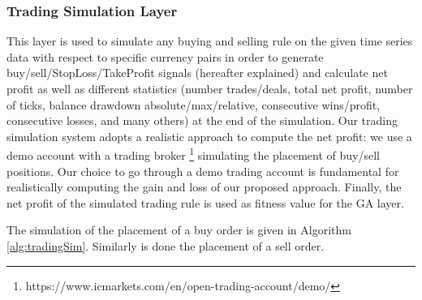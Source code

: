 \subsubsection{Trading Simulation Layer}
\label{subsection:trading}
This layer is used to simulate any buying and selling rule on the given time series data with respect to specific currency pairs in order to generate buy/sell/StopLoss/TakeProfit signals (hereafter explained) and calculate net profit as well as different statistics (number trades/deals, total net profit, number of ticks, balance drawdown absolute/max/relative, consecutive wins/profit, consecutive losses, and many others) at the end of the simulation. Our trading simulation system adopts a realistic approach to compute the net profit: we use a demo account with a trading broker \footnote{https://www.icmarkets.com/en/open-trading-account/demo/} simulating the placement of buy/sell positions. Our choice to go through a demo trading account is fundamental for realistically computing the gain and loss of our proposed approach. Finally, the net profit of the simulated trading rule is used as fitness value for the GA layer. 

The simulation of the placement of a buy order is given in Algorithm \ref{alg:tradingSim}. Similarly is done the placement of a sell order.

